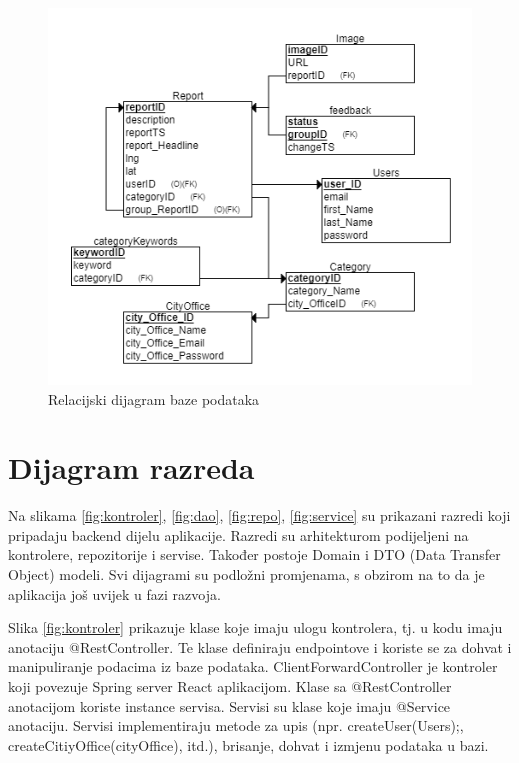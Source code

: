 			\begin{figure}[H]
				\includegraphics[width=\textwidth]{slike/relacijski.png} %
				\caption{Relacijski dijagram baze podataka}
				\label{fig:DijagramBazePodataka} %
			\end{figure}
			
			\eject
			
			
		\section{Dijagram razreda}
		
			Na slikama \ref{fig:kontroler}, \ref{fig:dao}, \ref{fig:repo}, \ref{fig:service} su prikazani razredi koji pripadaju backend dijelu aplikacije. Razredi su arhitekturom podijeljeni na kontrolere, repozitorije i servise. Također postoje Domain i DTO (Data Transfer Object) modeli. Svi dijagrami su podložni promjenama, s obzirom na to da je aplikacija još uvijek u fazi razvoja.
		
			Slika \ref{fig:kontroler} prikazuje klase koje imaju ulogu kontrolera, tj. u kodu imaju anotaciju @RestController. Te klase definiraju endpointove i koriste se za dohvat i manipuliranje podacima iz baze podataka. ClientForwardController je kontroler koji povezuje Spring server React aplikacijom. Klase sa @RestController anotacijom koriste instance servisa. Servisi su klase koje imaju @Service anotaciju. Servisi implementiraju metode za upis (npr. createUser(Users);, createCitiyOffice(cityOffice), itd.), brisanje, dohvat i izmjenu podataka u bazi.
		
